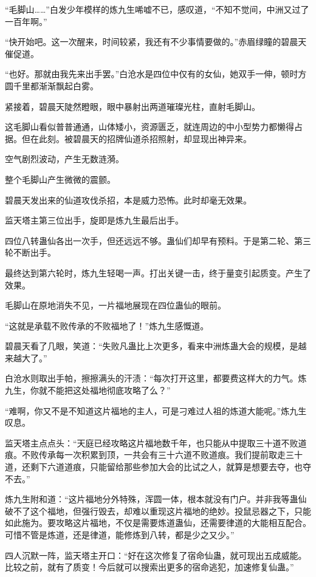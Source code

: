 \begin{this_body}
“毛脚山……”白发少年模样的炼九生唏嘘不已，感叹道，“不知不觉间，中洲又过了一百年啊。”

“快开始吧。这一次醒来，时间较紧，我还有不少事情要做的。”赤眉绿瞳的碧晨天催促道。

“也好。那就由我先来出手罢。”白沧水是四位中仅有的女仙，她双手一伸，顿时方圆千里都渐渐飘起白雾。

紧接着，碧晨天陡然瞪眼，眼中暴射出两道璀璨光柱，直射毛脚山。

这毛脚山看似普普通通，山体矮小，资源匮乏，就连周边的中小型势力都懒得占据。但在此刻。被碧晨天的招牌仙道杀招照射，却显现出神异来。

空气剧烈波动，产生无数涟漪。

整个毛脚山产生微微的震颤。

碧晨天发出来的仙道攻伐杀招，本是威力恐怖。此时却毫无效果。

监天塔主第三位出手，旋即是炼九生最后出手。

四位八转蛊仙各出一次手，但还远远不够。蛊仙们却早有预料。于是第二轮、第三轮不断出手。

最终达到第六轮时，炼九生轻喝一声。打出关键一击，终于量变引起质变。产生了效果。

毛脚山在原地消失不见，一片福地展现在四位蛊仙的眼前。

“这就是承载不败传承的不败福地了！”炼九生感慨道。

碧晨天看了几眼，笑道：“失败凡蛊比上次更多，看来中洲炼蛊大会的规模，是越来越大了。”

白沧水则取出手帕，擦擦满头的汗渍：“每次打开这里，都要费这样大的力气。炼九生，你就不能把这处福地彻底攻略了么？”

“难啊，你又不是不知道这片福地的主人，可是刁难过人祖的炼道大能呢。”炼九生叹息。

监天塔主点点头：“天庭已经攻略这片福地数千年，也只能从中提取三十道不败道痕。不败传承每一次积累到顶，一共会有三十六道不败道痕。我们提前取走三十道，还剩下六道道痕，只能留给那些参加大会的比试之人，就算是想要去夺，也夺不去。”

炼九生附和道：“这片福地分外特殊，浑圆一体，根本就没有门户。并非我等蛊仙破不了这个福地，但强行毁去，却难以重现这片福地的绝妙。投鼠忌器之下，只能如此施为。要攻略这片福地，不仅是需要炼道蛊仙，还需要律道的大能相互配合。可惜不管是炼道，还是律道，能修炼到八转，都是少之又少。”

四人沉默一阵，监天塔主开口：“好在这次修复了宿命仙蛊，就可现出五成威能。比较之前，就有了质变！今后就可以搜索出更多的宿命逃犯，加速修复仙蛊。”


\end{this_body}
